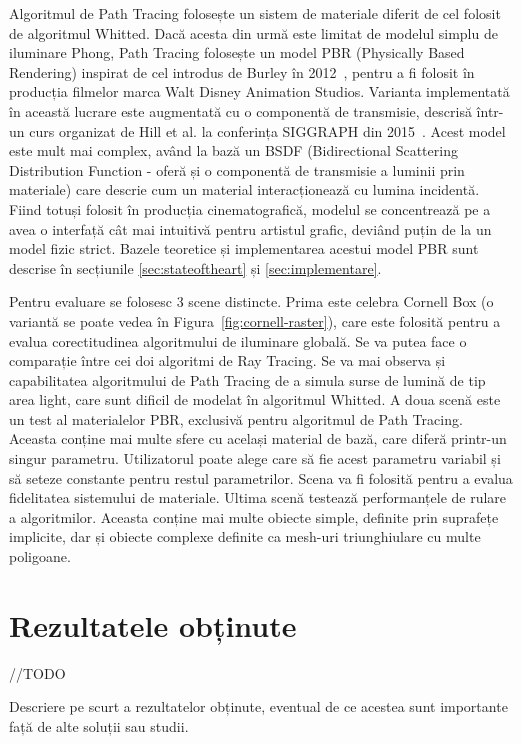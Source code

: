 \documentclass[12pt,a4paper]{report}
\numberwithin{equation}{section} %
\begin{document}
Algoritmul de Path Tracing folosește un sistem de materiale diferit de cel folosit
de algoritmul Whitted. Dacă acesta din urmă este limitat de modelul simplu de iluminare
Phong, Path Tracing folosește un model PBR (Physically Based Rendering) inspirat de
cel introdus de Burley în 2012~\cite{Disney}, pentru a fi folosit în producția filmelor
marca Walt Disney Animation Studios. Varianta implementată în această lucrare este
augmentată cu o componentă de transmisie, descrisă într-un curs organizat de Hill et al. la conferința SIGGRAPH din 2015~\cite{DisneyBSDF}.
Acest model este mult mai complex,
având la bază un BSDF (Bidirectional Scattering Distribution Function - oferă și
o componentă de transmisie a luminii prin materiale) care descrie cum un material
interacționează cu lumina incidentă. Fiind totuși folosit în producția cinematografică,
modelul se concentrează pe a avea o interfață cât mai intuitivă pentru artistul
grafic, deviând puțin de la un model fizic strict. Bazele teoretice și implementarea acestui model
PBR sunt descrise în secțiunile \ref{sec:stateoftheart} și \ref{sec:implementare}.

Pentru evaluare se folosesc 3 scene distincte. Prima este celebra Cornell Box
(o variantă se poate vedea în Figura~\ref{fig:cornell-raster}), care este folosită
pentru a evalua corectitudinea algoritmului de iluminare globală. Se va putea
face o comparație între cei doi algoritmi de Ray Tracing. Se va mai observa și
capabilitatea algoritmului de Path Tracing de a simula surse de lumină de tip
area light, care sunt dificil de modelat în algoritmul Whitted.
A doua scenă este un test al materialelor PBR, exclusivă pentru algoritmul de Path Tracing.
Aceasta conține mai multe sfere cu același material de bază, care diferă
printr-un singur parametru. Utilizatorul poate alege care să fie acest parametru
variabil și să seteze constante pentru restul parametrilor. Scena va fi folosită pentru
a evalua fidelitatea sistemului de materiale.
Ultima scenă testează performanțele de rulare a algoritmilor. Aceasta conține
mai multe obiecte simple, definite prin suprafețe implicite, dar și obiecte
complexe definite ca mesh-uri triunghiulare cu multe poligoane.

\section{Rezultatele obținute}

//TODO

Descriere pe scurt a rezultatelor obținute, eventual de ce acestea sunt importante față de alte soluții sau studii.
\end{document}
